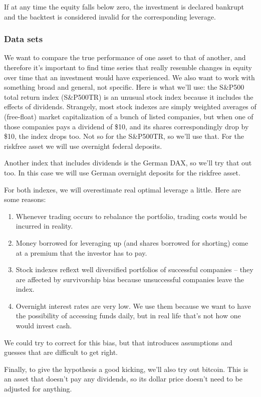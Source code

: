 If at any time the equity falls below zero, the investment is declared bankrupt and the backtest is considered invalid for the corresponding leverage. 

\subsubsection{Data sets}
We want to compare the true performance of one asset to that of another, and therefore it's important to find time series that really resemble changes in equity over time that an investment would have experienced. We also want to work with something broad and general, not specific. Here is what we'll use: the S\&P500 total return index (S\&P500TR) is an unusual stock index because it includes the effects of dividends. Strangely, most stock indexes are simply weighted averages of (free-float) market capitalization of a bunch of listed companies, but when one of those companies pays a dividend of \$10, and its shares correspondingly drop by \$10, the index drops too. Not so for the S\&P500TR, so we'll use that. For the riskfree asset we will use overnight federal deposits.

Another index that includes dividends is the German DAX, so we'll try that out too. In this case we will use German overnight deposits for the riskfree asset.

For both indexes, we will overestimate real optimal leverage a little. Here are some reasons: 
\begin{enumerate}
\item Whenever trading occurs to rebalance the portfolio, trading costs would be incurred in reality. 
\item Money borrowed for leveraging up (and shares borrowed for shorting) come at a premium that the investor has to pay. 
\item Stock indexes reflext well diversified portfolios of successful companies -- they are affected by survivorship bias because unsuccessful companies leave the index. 
\item Overnight interest rates are very low. We use them because we want to have the possibility of accessing funds daily, but in real life that's not how one would invest cash.
\end{enumerate}
We could try to correct for this bias, but that introduces assumptions and guesses that are difficult to get right.

Finally, to give the hypothesis a good kicking, we'll also try out bitcoin. This is an asset that doesn't pay any dividends, so its dollar price doesn't need to be adjusted for anything.


